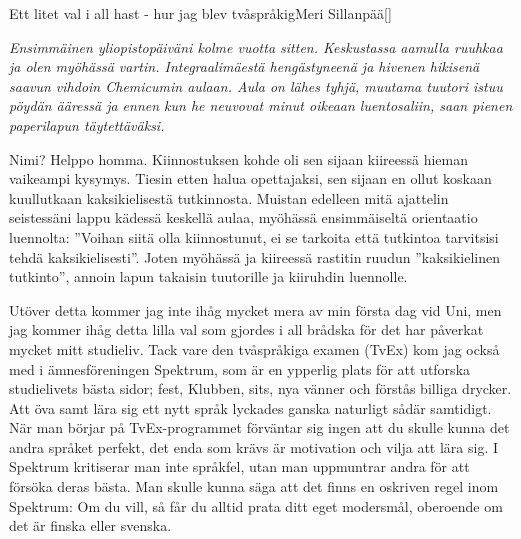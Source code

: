 \documentclass{spektraklet}
\begin{document}
\begin{artikel}{Ett litet val i all hast - hur jag blev tvåspråkig}{Meri Sillanpää}[]
\begin{twocolumns}

\textit{Ensimmäinen yliopistopäiväni kolme vuotta sitten. Keskustassa aamulla ruuhkaa ja olen myöhässä vartin. Integraalimäestä hengästyneenä ja hivenen hikisenä saavun vihdoin Chemicumin aulaan. Aula on lähes tyhjä, muutama tuutori istuu pöydän ääressä ja ennen kun he neuvovat minut oikeaan luentosaliin, saan pienen paperilapun täytettäväksi.}
 
\vspace{0.2cm}
\noindent{}
\vspace{0.2cm}


Nimi? Helppo homma. Kiinnostuksen kohde oli sen sijaan kiireessä hieman vaikeampi kysymys. Tiesin etten halua opettajaksi, sen sijaan en ollut koskaan kuullutkaan kaksikielisestä tutkinnosta. Muistan edelleen mitä ajattelin seistessäni lappu kädessä keskellä aulaa, myöhässä ensimmäiseltä orientaatio luennolta: ”Voihan siitä olla kiinnostunut, ei se tarkoita että tutkintoa tarvitsisi tehdä kaksikielisesti”. Joten myöhässä ja kiireessä rastitin ruudun ”kaksikielinen tutkinto”, annoin lapun takaisin tuutorille ja kiiruhdin luennolle.

\columnbreak
Utöver detta kommer jag inte ihåg mycket mera av min första dag vid Uni, men jag kommer ihåg detta lilla val som gjordes i all brådska för det har påverkat mycket mitt studieliv. Tack vare den tvåspråkiga examen (TvEx) kom jag också med i ämnesföreningen Spektrum, som är en ypperlig plats för att utforska studielivets bästa sidor; fest, Klubben, sits, nya vänner och förstås billiga drycker. Att öva samt lära sig ett nytt språk lyckades ganska naturligt sådär samtidigt. När man börjar på TvEx-programmet förväntar sig ingen att du skulle kunna det andra språket perfekt, det enda som krävs är motivation och vilja att lära sig. I Spektrum kritiserar man inte språkfel, utan man uppmuntrar andra för att försöka deras bästa. Man skulle kunna säga att det finns en oskriven regel inom Spektrum: Om du vill, så får du alltid prata ditt eget modersmål, oberoende om det är finska eller svenska.


\end{twocolumns}
\end{artikel}
\end{document}
